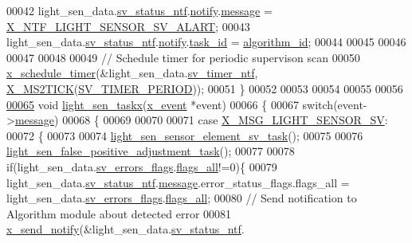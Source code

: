 \begin{DoxyCode}
00042     light\_sen\_data.\hyperlink{a00024_a35ce77844e6990e2537b2f11cd2d5cca}{sv\_status\_ntf}.\hyperlink{a00018_a8e6a04c2283f9fd7b8dcbc62faba5847}{notify}.\hyperlink{a00036_adf9665938515a20c283eea2c978cf80d}{message}                    = 
      \hyperlink{a00021_a472c0187f61238cdef62bf3d965df8e2}{X\_NTF\_LIGHT\_SENSOR\_SV\_ALART};
00043     light\_sen\_data.\hyperlink{a00024_a35ce77844e6990e2537b2f11cd2d5cca}{sv\_status\_ntf}.\hyperlink{a00018_a8e6a04c2283f9fd7b8dcbc62faba5847}{notify}.\hyperlink{a00036_a21b41e494a28583d4da10f1afb1c5328}{task\_id}                = 
      \hyperlink{a00021_aff3e3d622fcd96787628167d3c1856f9}{algorithm\_id};
00044 
00045 
00046 
00047 
00048 
00049     \textcolor{comment}{// Schedule timer for periodic supervison scan}
00050     \hyperlink{a00036_a9e3befaa21e83f196f74201deed85346}{x\_schedule\_timer}(&light\_sen\_data.\hyperlink{a00024_ada91b200053f2d93e3639dc4ee3415b4}{sv\_timer\_ntf},
      \hyperlink{a00036_a1732cd929c486b3a225824bb2b3dba36}{X\_MS2TICK}(\hyperlink{a00023_a8a535456285f4602701c814d7b69cc68}{SV\_TIMER\_PERIOD}));
00051 \}
00052 
00053 
00054 
00055 
00056 
\hypertarget{a00047_source_l00065}{}\hyperlink{a00047_ae9aa2f8b8e90a92755efbcd161c67bc0}{00065} \textcolor{keywordtype}{void} \hyperlink{a00047_ae9aa2f8b8e90a92755efbcd161c67bc0}{light\_sen\_taskx}(\hyperlink{a00036_de/d37/a00849}{x\_event} *event)
00066 \{
00067     \textcolor{keywordflow}{switch}(event->\hyperlink{a00036_adf9665938515a20c283eea2c978cf80d}{message})
00068     \{
00069 
00070     
00071         \textcolor{keywordflow}{case} \hyperlink{a00024_a5877f449ae4b7e77914fedf212c3d01f}{X\_MSG\_LIGHT\_SENSOR\_SV}:
00072         \{
00073 
00074             \hyperlink{a00047_ae68a20cad10654012eae75a1941f53db}{light\_sen\_sensor\_element\_sv\_task}();
00075 
00076             \hyperlink{a00047_a05bd338db50fc948cf13db4f250894da}{light\_sen\_false\_positive\_adjustment\_task}();
00077 
00078             \textcolor{keywordflow}{if}(light\_sen\_data.\hyperlink{a00024_aaeec6b0609dba31393f337abf1cce3d3}{sv\_errors\_flags}.\hyperlink{a00022_a1caa87b00c878186140c3bac9c8acf3b}{flags\_all}!=0)\{
00079              light\_sen\_data.\hyperlink{a00024_a35ce77844e6990e2537b2f11cd2d5cca}{sv\_status\_ntf}.\hyperlink{a00018_a18ed963ee616596e9d500e042f228818}{message}.error\_status\_flags.flags\_all = 
      light\_sen\_data.\hyperlink{a00024_aaeec6b0609dba31393f337abf1cce3d3}{sv\_errors\_flags}.\hyperlink{a00022_a1caa87b00c878186140c3bac9c8acf3b}{flags\_all};
00080              \textcolor{comment}{// Send notification to Algorithm module about detected error}
00081              \hyperlink{a00036_ae17b0bb16da3c471bb6074bb4c4d0fee}{x\_send\_notify}(&light\_sen\_data.\hyperlink{a00024_a35ce77844e6990e2537b2f11cd2d5cca}{sv\_status\_ntf}.

\end{DoxyCode}
